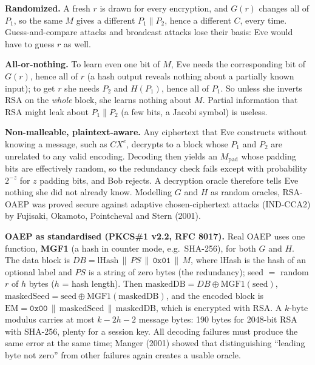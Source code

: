 \textbf{Randomized.} A fresh $r$ is drawn for every encryption, and $G(r)$ changes all of $P_1$, so the same $M$ gives a different $P_1 \| P_2$, hence a different $C$, every time. Guess-and-compare attacks and broadcast attacks lose their basis: Eve would have to guess $r$ as well.

\textbf{All-or-nothing.} To learn even one bit of $M$, Eve needs the corresponding bit of $G(r)$, hence all of $r$ (a hash output reveals nothing about a partially known input); to get $r$ she needs $P_2$ and $H(P_1)$, hence all of $P_1$. So unless she inverts RSA on the \emph{whole} block, she learns nothing about $M$. Partial information that RSA might leak about $P_1 \| P_2$ (a few bits, a Jacobi symbol) is useless.

\textbf{Non-malleable, plaintext-aware.} Any ciphertext that Eve constructs without knowing a message, such as $C X^e$, decrypts to a block whose $P_1$ and $P_2$ are unrelated to any valid encoding. Decoding then yields an $M_{\text{pad}}$ whose padding bits are effectively random, so the redundancy check fails except with probability $2^{-z}$ for $z$ padding bits, and Bob rejects. A decryption oracle therefore tells Eve nothing she did not already know. Modelling $G$ and $H$ as random oracles, RSA-OAEP was proved secure against adaptive chosen-ciphertext attacks (IND-CCA2) by Fujisaki, Okamoto, Pointcheval and Stern (2001).

\textbf{OAEP as standardised (PKCS\#1 v2.2, RFC 8017).} Real OAEP uses one function, \textbf{MGF1} (a hash in counter mode, e.g.\ SHA-256), for both $G$ and $H$. The data block is $DB = \text{lHash} \,\|\, PS \,\|\, \texttt{0x01} \,\|\, M$, where lHash is the hash of an optional label and $PS$ is a string of zero bytes (the redundancy); seed $=$ random $r$ of $h$ bytes ($h$ = hash length). Then $\text{maskedDB} = DB \oplus \text{MGF1}(\text{seed})$, $\text{maskedSeed} = \text{seed} \oplus \text{MGF1}(\text{maskedDB})$, and the encoded block is $\text{EM} = \texttt{0x00} \,\|\, \text{maskedSeed} \,\|\, \text{maskedDB}$, which is encrypted with RSA. A $k$-byte modulus carries at most $k - 2h - 2$ message bytes: 190 bytes for 2048-bit RSA with SHA-256, plenty for a session key. All decoding failures must produce the same error at the same time; Manger (2001) showed that distinguishing ``leading byte not zero'' from other failures again creates a usable oracle.

